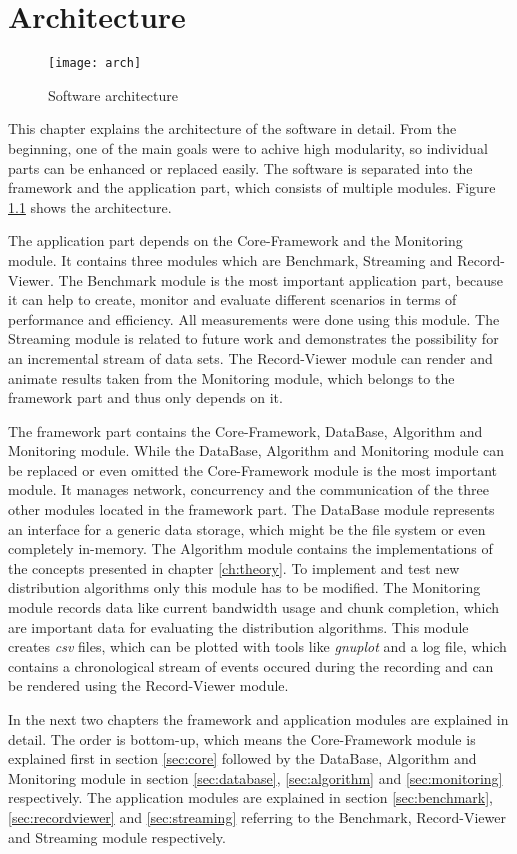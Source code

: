 \chapter{Architecture}
\label{ch:arch}

\begin{figure}[ht]
	\centering
	\texttt{[image: arch]}
	\caption{Software architecture}
	\label{fig:arch}
\end{figure}

This chapter explains the architecture of the software in detail. From the beginning, one of the main goals were to achive high modularity, so individual parts can be enhanced or replaced easily. The software is separated into the framework and the application part, which consists of multiple modules. Figure \ref{fig:arch} shows the architecture. 

The application part depends on the Core-Framework and the Monitoring module. It contains three modules which are Benchmark, Streaming and Record-Viewer. The Benchmark module is the most important application part, because it can help to create, monitor and evaluate different scenarios in terms of performance and efficiency. All measurements were done using this module. The Streaming module is related to future work and demonstrates the possibility for an incremental stream of data sets. The Record-Viewer module can render and animate results taken from the Monitoring module, which belongs to the framework part and thus only depends on it.

The framework part contains the Core-Framework, DataBase, Algorithm and Monitoring module. While the DataBase, Algorithm and Monitoring module can be replaced or even omitted the Core-Framework module is the most important module. It manages network, concurrency and the communication of the three other modules located in the framework part. The DataBase module represents an interface for a generic data storage, which might be the file system or even completely in-memory. The Algorithm module contains the implementations of the concepts presented in chapter \ref{ch:theory}. To implement and test new distribution algorithms only this module has to be modified. The Monitoring module records data like current bandwidth usage and chunk completion, which are important data for evaluating the distribution algorithms. This module creates \emph{csv} files, which can be plotted with tools like \emph{gnuplot} and a log file, which contains a chronological stream of events occured during the recording and can be rendered using the Record-Viewer module.

In the next two chapters the framework and application modules are explained in detail. The order is bottom-up, which means the Core-Framework module is explained first in section \ref{sec:core} followed by the DataBase, Algorithm and Monitoring module in section \ref{sec:database}, \ref{sec:algorithm} and \ref{sec:monitoring} respectively. The application modules are explained in section \ref{sec:benchmark}, \ref{sec:recordviewer} and \ref{sec:streaming} referring to the Benchmark, Record-Viewer and Streaming module respectively.